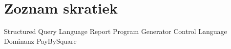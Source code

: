 \pagestyle{plain}
\vspace{0pt plus 2cm}
\chapter*{Zoznam skratiek}
\begin{acronym}
     {Structured Query Language}
     {Report Program Generator}
     {Control Language}
     {Dominanz}
     {PayBySquare}
\end{acronym}


